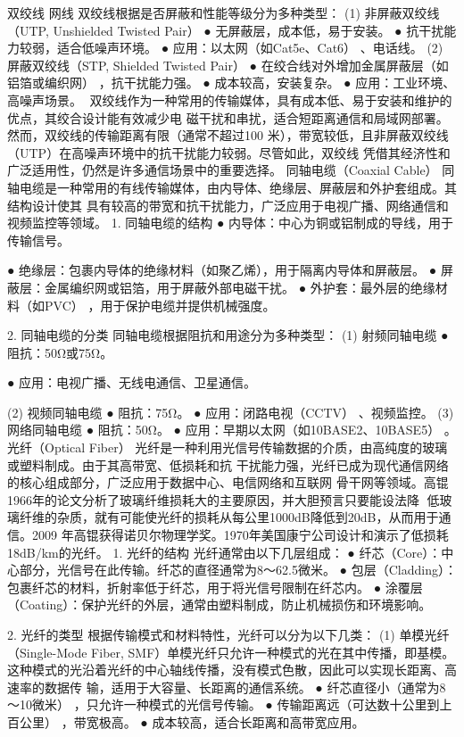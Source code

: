 双绞线
                           网线
双绞线根据是否屏蔽和性能等级分为多种类型：
(1) 非屏蔽双绞线（UTP, Unshielded Twisted Pair）
  ● 无屏蔽层，成本低，易于安装。
  ● 抗干扰能力较弱，适合低噪声环境。
  ● 应用：以太网（如Cat5e、Cat6）    、电话线。
(2) 屏蔽双绞线（STP, Shielded Twisted Pair）
  ● 在绞合线对外增加金属屏蔽层（如铝箔或编织网）              ，抗干扰能力强。
  ● 成本较高，安装复杂。
  ● 应用：工业环境、高噪声场景。
双绞线作为一种常用的传输媒体，具有成本低、易于安装和维护的优点，其绞合设计能有效减少电
磁干扰和串扰，适合短距离通信和局域网部署。然而，双绞线的传输距离有限（通常不超过100
米），带宽较低，且非屏蔽双绞线（UTP）在高噪声环境中的抗干扰能力较弱。尽管如此，双绞线
凭借其经济性和广泛适用性，仍然是许多通信场景中的重要选择。
同轴电缆（Coaxial Cable）
同轴电缆是一种常用的有线传输媒体，由内导体、绝缘层、屏蔽层和外护套组成。其结构设计使其
具有较高的带宽和抗干扰能力，广泛应用于电视广播、网络通信和视频监控等领域。
1. 同轴电缆的结构
  ● 内导体：中心为铜或铝制成的导线，用于传输信号。

  ● 绝缘层：包裹内导体的绝缘材料（如聚乙烯），用于隔离内导体和屏蔽层。
  ● 屏蔽层：金属编织网或铝箔，用于屏蔽外部电磁干扰。
  ● 外护套：最外层的绝缘材料（如PVC）
                     ，用于保护电缆并提供机械强度。




2. 同轴电缆的分类
同轴电缆根据阻抗和用途分为多种类型：
(1) 射频同轴电缆
  ● 阻抗：50Ω或75Ω。

  ● 应用：电视广播、无线电通信、卫星通信。

(2) 视频同轴电缆
  ● 阻抗：75Ω。
  ● 应用：闭路电视（CCTV）
                、视频监控。
(3) 网络同轴电缆
  ● 阻抗：50Ω。
  ● 应用：早期以太网（如10BASE2、10BASE5）
                             。
光纤（Optical Fiber）
光纤是一种利用光信号传输数据的介质，由高纯度的玻璃或塑料制成。由于其高带宽、低损耗和抗
干扰能力强，光纤已成为现代通信网络的核心组成部分，广泛应用于数据中心、电信网络和互联网
骨干网等领域。高锟1966年的论文分析了玻璃纤维损耗大的主要原因，并大胆预言只要能设法降
低玻璃纤维的杂质，就有可能使光纤的损耗从每公里1000dB降低到20dB，从而用于通信。2009
年高锟获得诺贝尔物理学奖。1970年美国康宁公司设计和演示了低损耗18dB/km的光纤。
1. 光纤的结构
光纤通常由以下几层组成：
  ● 纤芯（Core）：中心部分，光信号在此传输。纤芯的直径通常为8～62.5微米。
  ● 包层（Cladding）：包裹纤芯的材料，折射率低于纤芯，用于将光信号限制在纤芯内。
  ● 涂覆层（Coating）：保护光纤的外层，通常由塑料制成，防止机械损伤和环境影响。




2. 光纤的类型
根据传输模式和材料特性，光纤可以分为以下几类：
(1) 单模光纤（Single-Mode Fiber, SMF）单模光纤只允许一种模式的光在其中传播，即基模。
这种模式的光沿着光纤的中心轴线传播，没有模式色散，因此可以实现长距离、高速率的数据传
输，适用于大容量、长距离的通信系统。
  ● 纤芯直径小（通常为8～10微米）        ，只允许一种模式的光信号传输。
  ● 传输距离远（可达数十公里到上百公里）           ，带宽极高。
  ● 成本较高，适合长距离和高带宽应用。

